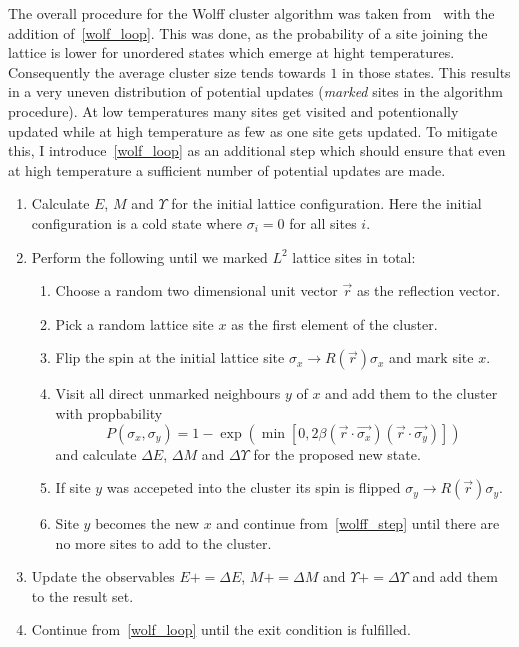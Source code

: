 		The overall procedure for the Wolff cluster algorithm was taken from~\cite[p. 361]{wolff} with the addition of~\cref{wolf_loop}. This was done, as the probability of a site joining the lattice is lower for unordered states which emerge at hight temperatures. Consequently the average cluster size tends towards $1$ in those states. This results in a very uneven distribution of potential updates (\emph{marked} sites in the algorithm procedure). At low temperatures many sites get visited and potentionally updated while at high temperature as few as one site gets updated. To mitigate this, I introduce~\cref{wolf_loop} as an additional step which should ensure that even at high temperature a sufficient number of potential updates are made.
		\begin{enumerate}
			\item Calculate $E$, $M$ and $\Upsilon$ for the initial lattice configuration. Here the initial configuration is a cold state where $\sigma_i = 0$ for all sites $i$.
			\item \label{wolf_loop} Perform the following until we marked $L^2$ lattice sites in total:
			\begin{enumerate}
				\item Choose a random two dimensional unit vector $\vec{r}$ as the reflection vector.
				\item Pick a random lattice site $x$ as the first element of the cluster.
				\item Flip the spin at the initial lattice site $\sigma_x \rightarrow R(\vec{r}) \sigma_x$ and mark site $x$.
				\item \label{wolff_step} Visit all direct unmarked neighbours $y$ of $x$ and add them to the cluster with propbability
					\begin{equation}
						P(\sigma_x, \sigma_y) = 1 - \exp(\min[0, 2 \beta (\vec{r}\cdot\vec{\sigma_x}) (\vec{r}\cdot\vec{\sigma_y})])
					\end{equation}
					and calculate $\Delta E$, $\Delta M$ and $\Delta \Upsilon$ for the proposed new state.
				\item If site $y$ was accepeted into the cluster its spin is flipped $\sigma_y \rightarrow R(\vec{r}) \sigma_y$.
				\item Site $y$ becomes the new $x$ and continue from~\cref{wolff_step} until there are no more sites to add to the cluster.
			\end{enumerate}
			\item Update the observables $E \mathrel{{+}{=}} \Delta E$, $M \mathrel{{+}{=}} \Delta M$ and $\Upsilon \mathrel{{+}{=}} \Delta \Upsilon$ and add them to the result set.
			\item Continue from~\cref{wolf_loop} until the exit condition is fulfilled.
		\end{enumerate}
		
